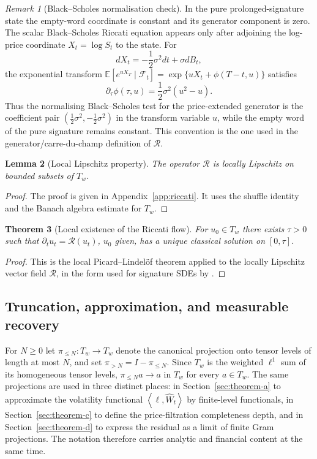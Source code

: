 \documentclass[11pt,oneside]{article}
\theoremstyle{plain}
\newtheorem{theorem}{Theorem}[section]
\newtheorem{lemma}[theorem]{Lemma}
\theoremstyle{definition}
\theoremstyle{remark}
\newtheorem{remark}[theorem]{Remark}
\newcommand{\E}{\mathbb{E}}
\newcommand{\Tw}{T_w}
\newcommand{\cW}{\widehat W}
\newcommand{\Rs}{\mathcal R}
\newcommand{\inner}[2]{\left\langle #1,#2\right\rangle}
\begin{document}
\begin{remark}[Black--Scholes normalisation check]\label{rem:riccati-bs-sanity}
In the pure prolonged-signature state the empty-word coordinate is constant and its generator component is zero. The scalar Black--Scholes Riccati equation appears only after adjoining the log-price coordinate $X_t=\log S_t$ to the state. For
\[
dX_t=-\frac12\sigma^2dt+\sigma dB_t,
\]
the exponential transform $\E[e^{uX_T}\mid\mathcal F_t]=\exp\{uX_t+\phi(T-t,u)\}$ satisfies
\[
\partial_\tau\phi(\tau,u)=\frac12\sigma^2(u^2-u).
\]
Thus the normalising Black--Scholes test for the price-extended generator is the coefficient pair $(\frac12\sigma^2,-\frac12\sigma^2)$ in the transform variable $u$, while the empty word of the pure signature remains constant. This convention is the one used in the generator/carre-du-champ definition of $\Rs$.
\end{remark}

\begin{lemma}[Local Lipschitz property]\label{lem:local-lipschitz}
The operator $\Rs$ is locally Lipschitz on bounded subsets of $\Tw$.
\end{lemma}

\begin{proof}
The proof is given in Appendix~\ref{app:riccati}. It uses the shuffle identity and the Banach algebra estimate for $\Tw$.
\end{proof}

\begin{theorem}[Local existence of the Riccati flow]
For $u_0\in\Tw$ there exists $\tau>0$ such that $\partial_tu_t=\Rs(u_t)$, $u_0$ given, has a unique classical solution on $[0,\tau]$.
\end{theorem}

\begin{proof}
This is the local Picard--Lindel\"of theorem applied to the locally Lipschitz vector field $\Rs$, in the form used for signature SDEs by \citet{CuchieroSvalutoFerroTeichmann2023}.
\end{proof}


\subsection{Truncation, approximation, and measurable recovery}
\label{subsec:truncation-approximation}
For $N\geq 0$ let $\pi_{\leq N}:\Tw\to \Tw$ denote the canonical projection onto tensor levels of length at most $N$, and set $\pi_{>N}=I-\pi_{\leq N}$. Since $\Tw$ is the weighted $\ell^1$ sum of its homogeneous tensor levels, $\pi_{\leq N}a\to a$ in $\Tw$ for every $a\in\Tw$. The same projections are used in three distinct places: in Section~\ref{sec:theorem-a} to approximate the volatility functional $\inner{\ell}{\cW_t}$ by finite-level functionals, in Section~\ref{sec:theorem-c} to define the price-filtration completeness depth, and in Section~\ref{sec:theorem-d} to express the residual as a limit of finite Gram projections. The notation therefore carries analytic and financial content at the same time.
\end{document}
